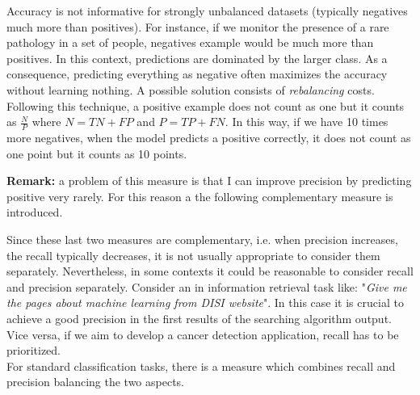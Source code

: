 
Accuracy is not informative for strongly unbalanced datasets (typically negatives much more than positives). For instance, if we monitor the presence of a rare pathology in a set of people, negatives example would be much more than positives. In this context, predictions are dominated by the larger class. As a consequence, predicting everything as negative often maximizes the accuracy without learning nothing. A possible solution consists of \textit{rebalancing} costs. Following this technique, a positive example does not count as one but it counts as $\frac{N}{P}$ where $N=TN+FP$ and $P=TP+FN$. In this way, if we have 10 times more negatives, when the model predicts a positive correctly, it does not count as one point but it counts as 10 points.


\textbf{Remark:} a problem of this measure is that I can improve precision by predicting positive very rarely. For this reason a the following complementary measure is introduced.

Since these last two measures are complementary, i.e. when precision increases, the recall typically decreases, it is not usually appropriate to consider them separately. Nevertheless, in some contexts it could be reasonable to consider recall and precision separately. Consider an in information retrieval task like: "\textit{Give me the pages about machine learning from DISI website}". In this case it is crucial to achieve a good precision in the first results of the searching algorithm output. Vice versa, if we aim to develop a cancer detection application, recall has to be prioritized.\\
For standard classification tasks, there is a measure which combines recall and precision balancing the two aspects.

